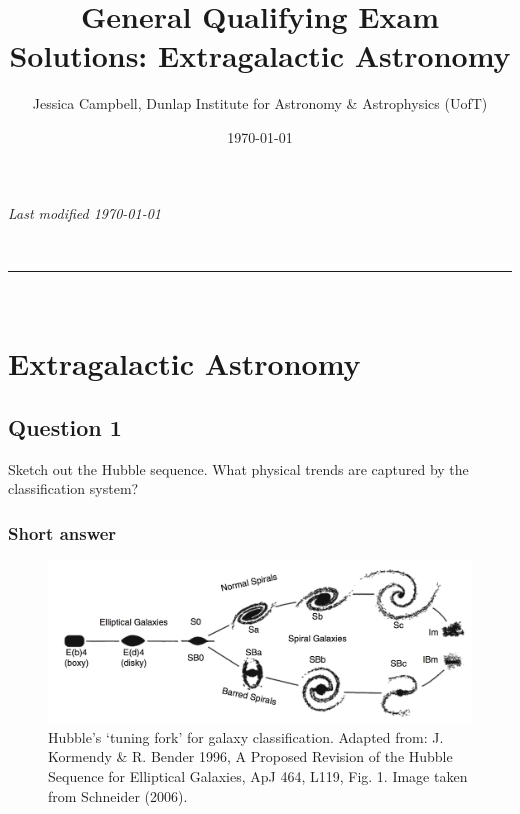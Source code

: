 \documentclass[a4paper,10pt]{article}
\makeatletter
\newcommand{\linia}{\rule{\linewidth}{0.5pt}}
\renewcommand{\maketitle}{
\begin{center}
\vspace{2ex}
{\huge \textsc{\@title}}
\vspace{1ex}
\\
\linia\\
\@author
\vspace{4ex}
\end{center}
}
\makeatother
\begin{document}
\hfill{\textit{Last modified \today}}
\title{General Qualifying Exam Solutions: Extragalactic Astronomy}
\author{Jessica Campbell, Dunlap Institute for Astronomy \& Astrophysics (UofT)}
\date{\today}
\maketitle

\tableofcontents


%
%
%
%

\newpage
\section{Extragalactic Astronomy}


\subsection{Question 1}

Sketch out the Hubble sequence. What physical trends are captured by the classification system?

\subsubsection{Short answer}

\begin{figure}[h]
    \centering
    \includegraphics[width=16cm]{figures/HubbleSequence.png}
    \caption{\footnotesize{Hubble’s `tuning fork' for galaxy classification. Adapted from: J. Kormendy \& R. Bender 1996, A Proposed Revision of the Hubble Sequence for Elliptical Galaxies, ApJ 464, L119, Fig. 1. Image taken from Schneider (2006).}}
    \label{fig:hubblesequence}
\end{figure}
\end{document}
